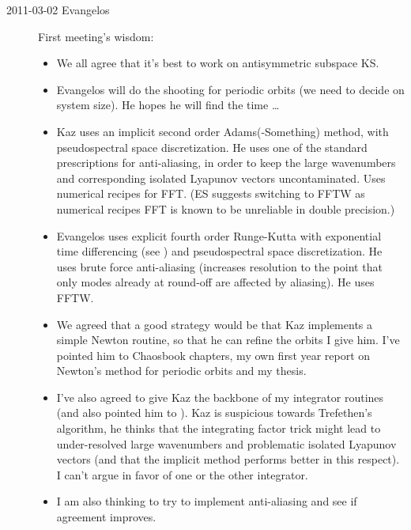 \begin{description}
\item[2011-03-02 Evangelos] First meeting's wisdom:
\begin{itemize}
 \item We all agree that it's best to work on antisymmetric subspace KS.
 \item Evangelos will do the shooting for periodic orbits 
	(we need to decide on system size). He hopes he will find the time \ldots  
 \item Kaz uses an implicit second order Adams(-Something) method, with
	pseudospectral space discretization. He uses one of the standard
	prescriptions for anti-aliasing, in order to keep the large wavenumbers
	and corresponding isolated Lyapunov vectors uncontaminated. Uses numerical 
	recipes for FFT. (ES suggests switching to FFTW as numerical recipes FFT is
	known to be unreliable in double precision.) 
 \item Evangelos uses explicit fourth order Runge-Kutta with exponential
	time differencing (see ) and pseudospectral space
	discretization. He uses brute force anti-aliasing (increases resolution
	to the point that only modes already at round-off are affected by
	aliasing). He uses FFTW. 
 \item We agreed that a good strategy would be that Kaz implements a simple
	Newton routine, so that he can refine the orbits I give him. I've 
	pointed him to Chaosbook chapters, my own first year report on Newton's
	method for periodic orbits and my thesis.
 \item I've also agreed to give Kaz the backbone of my integrator routines
	(and also pointed him to ). Kaz is suspicious towards
	Trefethen's algorithm, he thinks that the integrating factor trick might
	lead to under-resolved large wavenumbers and problematic isolated 
	Lyapunov vectors (and that the implicit method performs better in this
	respect). I can't argue in favor of one or the other integrator.
 \item I am also thinking to try to implement anti-aliasing and see
	if agreement improves.
\end{itemize}
 


\end{description}

\renewcommand{\ssp}{a}
